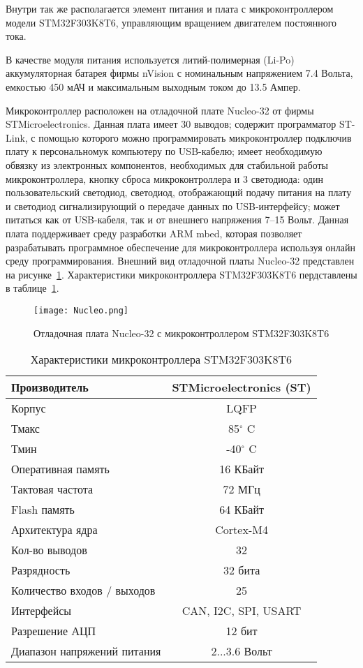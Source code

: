 Внутри так же располагается элемент питания и плата с микроконтроллером модели STM32F303K8T6, управляющим вращением двигателем постоянного тока. 

В качестве модуля питания используется литий-полимерная (Li-Po) аккумуляторная батарея фирмы nVision с номинальным напряжением 7.4 Вольта, емкостью 450 мАЧ и максимальным выходным током до 13.5 Ампер.


Микроконтроллер расположен на отладочной плате Nucleo-32 от фирмы STMicroelectronics. Данная плата имеет 30 выводов; содержит программатор ST-Link, с помощью которого можно программировать микроконтроллер подключив плату к персональномук компьютеру по USB-кабелю; имеет необходимую обвязку из электронных компонентов, необходимых для стабильной работы микроконтроллера, кнопку сброса микроконтроллера и 3 светодиода: один пользовательский светодиод, светодиод, отображающий подачу питания на плату и светодиод сигнализирующий о передаче данных по USB-интерфейсу; может питаться как от USB-кабеля, так и от внешнего напряжения 7--15 Вольт. Данная плата поддерживает среду разработки ARM mbed, которая позволяет разрабатывать программное обеспечение для микроконтроллера используя онлайн среду программирования. Внешний вид отладочной платы Nucleo-32 представлен на рисунке~\ref{Nucleo}. Характеристики микроконтроллера STM32F303K8T6 пердставлены в таблице~\ref{tabStm}.

\begin{figure}[h]
	\centering
	\texttt{[image: Nucleo.png]}%
	\caption{Отладочная плата Nucleo-32 с микроконтроллером STM32F303K8T6}
	\label{Nucleo}
\end{figure}

\begin{table}[h]
	\centering
	\caption{Характеристики микроконтроллера STM32F303K8T6}\label{tabStm}
	\begin{tabular}{|l|c|}
		\hline
		Производитель &	STMicroelectronics (ST) \\ \hline
		Корпус 	& LQFP \\ \hline
		Тмакс	&	85$^\circ$ C 	\\ \hline
		Тмин 	&	-40$^\circ$ C \\ \hline
		Оперативная память 	& 16 КБайт\\ \hline
		Тактовая частота	& 72 МГц 	\\ \hline
		Flash память & 64 КБайт\\ \hline
		Архитектура ядра & Cortex-M4	\\ \hline
		Кол-во выводов 	& 32\\ \hline
		Разрядность	& 32 бита\\ \hline
		Количество входов / выходов & 25	\\ \hline
		Интерфейсы 	& CAN, I2C, SPI, USART\\ \hline
		Разрешение АЦП & 12 бит\\ \hline
		Диапазон напряжений питания 	& 2...3.6 Вольт\\ \hline		
	\end{tabular}
\end{table}


